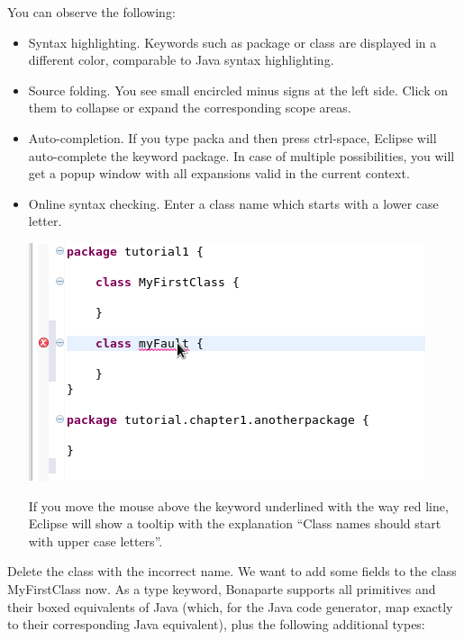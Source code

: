 \documentclass[11pt,a4paper,oneside]{article}
\begin{document}
\noindent
You can observe the following:
\begin{itemize}
  \item Syntax highlighting. Keywords such as {\ttfamily package} or {\ttfamily class} are displayed in a different color,
  comparable to Java syntax highlighting.
  \item Source folding. You see small encircled minus signs at the left side. Click on them to collapse or expand the corresponding scope areas.
  \item Auto-completion.  If you type {\ttfamily packa} and then press ctrl-space, Eclipse will auto-complete the keyword {\ttfamily package}.
  In case of multiple possibilities, you will get a popup window with all expansions valid in the current context.
  \item Online syntax checking. Enter a class name which starts with a lower case letter.

\vspace{2mm}

\hspace{1cm}\includegraphics[scale=0.5]{images/tut1-002.png}

    \noindent
    If you move the mouse above the keyword underlined with the way red line, Eclipse will show a tooltip with the explanation
     ``Class names should start with upper case letters''.

\end{itemize}

Delete the class with the incorrect name. We want to add some fields to the class {\ttfamily MyFirstClass} now. As a type keyword, Bonaparte supports all
primitives and their boxed equivalents of Java (which, for the Java code generator, map exactly to their corresponding Java equivalent), plus the following additional types:
\end{document}
